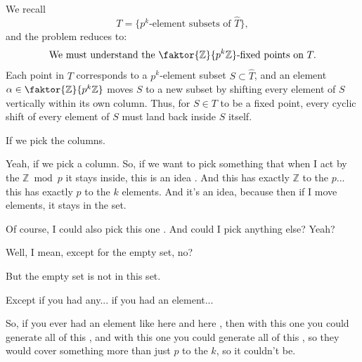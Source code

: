 \begin{proofWrapper}
\begin{content}
We recall
\[
T = \{ p^k\text{-element subsets of } \widehat{T} \},
\]
and the problem reduces to:
\[
\text{We must understand the } \faktor{\mathbb{Z}}{p^k\mathbb{Z}}\text{-fixed points on } T.
\]
Each point in $T$ corresponds to a $p^k$-element subset $S \subset \widehat{T}$, and an element $\alpha \in \faktor{\mathbb{Z}}{p^k\mathbb{Z}}$ moves $S$ to a new subset by shifting every element of $S$ vertically within its own column. Thus, for $S \in T$ to be a fixed point, every cyclic shift of every element of $S$ must land back inside $S$ itself.
\end{content}

\begin{student}
If we pick the columns.
\end{student}

\begin{speech}[01:04:32 - 01:05:03]
Yeah, if we pick a column. So, if we want to pick something that when I act by the $\mathbb{Z} \bmod p$ it stays inside, this is an idea . And this has exactly $\mathbb{Z}$ to the $p$... this has exactly $p$ to the $k$ elements. And it's an idea, because then if I move elements, it stays in the set.

Of course, I could also pick this one . And could I pick anything else? Yeah?
\end{speech}

\begin{student}
Well, I mean, except for the empty set, no?
\end{student}

\begin{speech}[01:05:05 - 01:05:07]
But the empty set is not in this set.
\end{speech}

\begin{student}
Except if you had any... if you had an element...
\end{student}

\begin{speech}[01:05:10 - 01:06:15]
So, if you ever had an element like here and here , then with this one you could generate all of this , and with this one you could generate all of this , so they would cover something more than just $p$ to the $k$, so it couldn't be.


\end{speech}
\end{proofWrapper}
